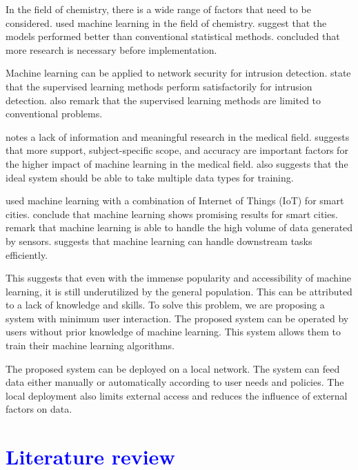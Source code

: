 \documentclass[a4paper,fleqn]{cas-dc}
\newcommand{\responsemodsm}[1]{\textcolor{blue}{#1}}
\newcommand{\sectionb}[1]{\section{\responsemodsm{#1}}}
\begin{document}
In the field of chemistry, there is a wide range of factors that need to be considered. \cite*{ref_paper_10} used machine learning in the field of chemistry. \citeauthor{ref_paper_10} suggest that the models performed better than conventional statistical methods. \citeauthor{ref_paper_10} concluded that more research is necessary before implementation.

Machine learning can be applied to network security for intrusion detection. \cite*{ref_paper_21} state that the supervised learning methods perform satisfactorily for intrusion detection. \citeauthor{ref_paper_21} also remark that the supervised learning methods are limited to conventional problems.

\cite*{ref_paper_24} notes a lack of information and meaningful research in the medical field. \citeauthor{ref_paper_24} suggests that more support, subject-specific scope, and accuracy are important factors for the higher impact of machine learning in the medical field. \citeauthor{ref_paper_24} also suggests that the ideal system should be able to take multiple data types for training.

\cite*{ref_paper_29} used machine learning with a combination of Internet of Things (IoT) for smart cities. \citeauthor{ref_paper_29} conclude that machine learning shows promising results for smart cities. \citeauthor{ref_paper_29} remark that machine learning is able to handle the high volume of data generated by sensors. \cite*{ref_paper_12} suggests that machine learning can handle downstream tasks efficiently.

This suggests that even with the immense popularity and accessibility of machine learning, it is still underutilized by the general population. This can be attributed to a lack of knowledge and skills. To solve this problem, we are proposing a system with minimum user interaction. The proposed system can be operated by users without prior knowledge of machine learning. This system allows them to train their machine learning algorithms.

The proposed system can be deployed on a local network. The system can feed data either manually or automatically according to user needs and policies. The local deployment also limits external access and reduces the influence of external factors on data.

\sectionb{Literature review}\label{sec:literature_review}
\end{document}

